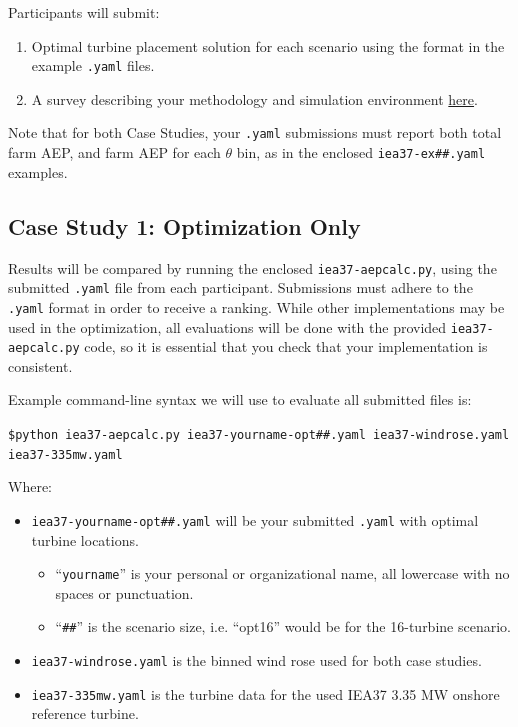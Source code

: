 \documentclass[10pt]{article}
\begin{document}
    Participants will submit:
    \begin{enumerate}
        \item Optimal turbine placement solution for each scenario using the format in the example \texttt{.yaml} files. 
        \item A survey describing your methodology and simulation environment \href{https://goo.gl/forms/2tX3eJ0rlnElmTgR2}{here}.
    \end{enumerate}

    Note that for both Case Studies, your \texttt{.yaml} submissions must report both total farm AEP, and farm AEP for each $\theta$ bin, as in the enclosed \texttt{iea37-ex\#\#.yaml} examples.

    \subsection{Case Study 1: Optimization Only}

        Results will be compared by running the enclosed \texttt{iea37-aepcalc.py}, using the submitted \texttt{.yaml} file from each participant.
        Submissions must adhere to the \texttt{.yaml} format in order to receive a ranking.
        While other implementations may be used in the optimization, all evaluations will be done with the provided \texttt{iea37-aepcalc.py} code, so it is essential that you check that your implementation is consistent.

        Example command-line syntax we will use to evaluate all submitted files is:
        
        \vspace{0.5em}
        \texttt{\$python iea37-aepcalc.py iea37-yourname-opt\#\#.yaml iea37-windrose.yaml iea37-335mw.yaml}
        \vspace{0.5em}
        
        \noindent Where: 
        \begin{itemize}
            \item \texttt{iea37-yourname-opt\#\#.yaml} will be your submitted \texttt{.yaml} with optimal turbine locations.
            \begin{itemize}
                \item ``\texttt{yourname}'' is your personal or organizational name, all lowercase with no spaces or punctuation.
                \item ``\texttt{\#\#}'' is the scenario size, i.e. ``opt16'' would be for the 16-turbine scenario.
            \end{itemize}
            \item \texttt{iea37-windrose.yaml} is the binned wind rose used for both case studies.
            \item \texttt{iea37-335mw.yaml} is the turbine data for the used IEA37 3.35 MW onshore reference turbine.
        \end{itemize}
\end{document}
